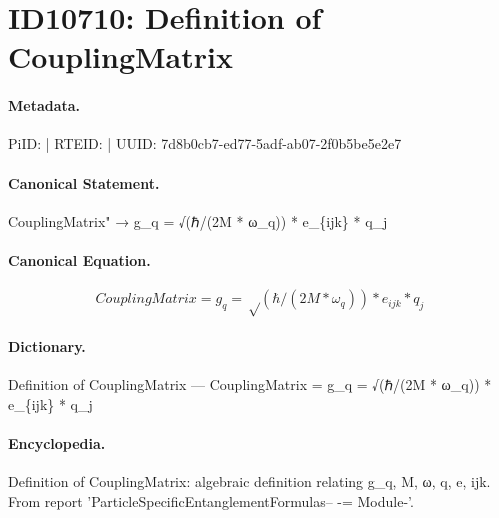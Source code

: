 \section*{ID10710: Definition of CouplingMatrix}
\paragraph{Metadata.}
PiID:  | RTEID:  | UUID: 7d8b0cb7-ed77-5adf-ab07-2f0b5be5e2e7

\paragraph{Canonical Statement.}
CouplingMatrix" → g\_q = √(ℏ/(2M * ω\_q)) * e\_\{ijk\} * q\_j

\paragraph{Canonical Equation.}
\[
CouplingMatrix = g_q = √(ℏ/(2M * ω_q)) * e_{ijk} * q_j
\]

\paragraph{Dictionary.}
Definition of CouplingMatrix — CouplingMatrix = g\_q = √(ℏ/(2M * ω\_q)) * e\_\{ijk\} * q\_j

\paragraph{Encyclopedia.}
Definition of CouplingMatrix: algebraic definition relating g\_q, M, ω, q, e, ijk. From report 'ParticleSpecificEntanglementFormulas-- -= Module-'.
